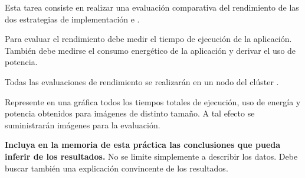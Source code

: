Esta tarea consiste en realizar una evaluación comparativa del rendimiento
de las dos estrategias de implementación  e .

Para evaluar el rendimiento debe medir el tiempo de ejecución de la
aplicación. También debe medirse el consumo energético de la aplicación
y derivar el uso de potencia.

Todas las evaluaciones de rendimiento se realizarán en un nodo del
clúster .

Represente en una gráfica todos los tiempos totales de ejecución, uso de energía y potencia
obtenidos para imágenes de distinto tamaño. A tal efecto
se suministrarán imágenes para la evaluación.

\textbf{Incluya en la memoria de esta práctica las conclusiones que pueda inferir de los resultados.}
No se limite simplemente a describir los datos. Debe buscar también una
explicación convincente de los resultados.

